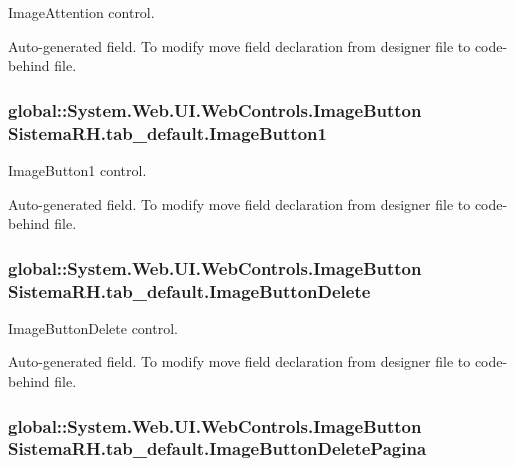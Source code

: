 ImageAttention control. 

Auto-\/generated field. To modify move field declaration from designer file to code-\/behind file. \hypertarget{class_sistema_r_h_1_1tab__default_a6dd7cd8bc8b80635edeae03f4b52e33b}{
\subsubsection[{ImageButton1}]{\setlength{\rightskip}{0pt plus 5cm}global::System.Web.UI.WebControls.ImageButton {\bf SistemaRH.tab\_\-default.ImageButton1}}}
\label{class_sistema_r_h_1_1tab__default_a6dd7cd8bc8b80635edeae03f4b52e33b}


ImageButton1 control. 

Auto-\/generated field. To modify move field declaration from designer file to code-\/behind file. \hypertarget{class_sistema_r_h_1_1tab__default_a8041c6b74b0c50b86441a8818a7cd7f5}{
\subsubsection[{ImageButtonDelete}]{\setlength{\rightskip}{0pt plus 5cm}global::System.Web.UI.WebControls.ImageButton {\bf SistemaRH.tab\_\-default.ImageButtonDelete}}}
\label{class_sistema_r_h_1_1tab__default_a8041c6b74b0c50b86441a8818a7cd7f5}


ImageButtonDelete control. 

Auto-\/generated field. To modify move field declaration from designer file to code-\/behind file. \hypertarget{class_sistema_r_h_1_1tab__default_a71b7957bed07d2d8e9026175d3ecdaf0}{
\subsubsection[{ImageButtonDeletePagina}]{\setlength{\rightskip}{0pt plus 5cm}global::System.Web.UI.WebControls.ImageButton {\bf SistemaRH.tab\_\-default.ImageButtonDeletePagina}}}
\label{class_sistema_r_h_1_1tab__default_a71b7957bed07d2d8e9026175d3ecdaf0}


